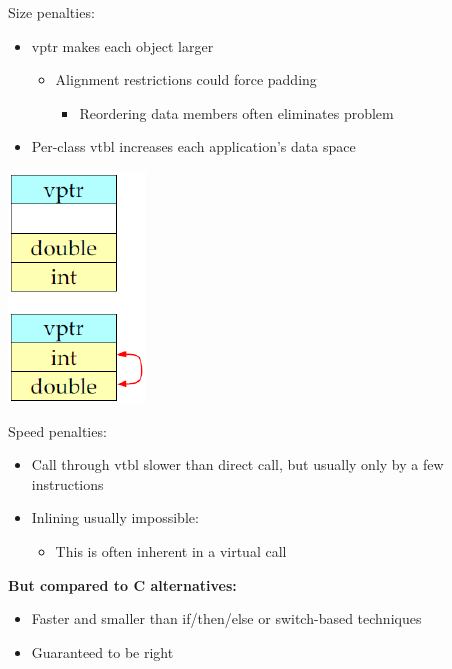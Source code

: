\begin{minipage}{0.75\linewidth}
Size penalties:
\begin{itemize}
  \item vptr makes each object larger
  \begin{itemize}
    \item Alignment restrictions could force padding
    \begin{itemize}
      \item Reordering data members often eliminates problem
    \end{itemize}
  \end{itemize}
  \item Per-class vtbl increases each application's data space
\end{itemize}
\end{minipage}%
\hfill
\begin{minipage}{0.2\linewidth}
\begin{center}
  \includegraphics[width=0.5\linewidth]{images/AdvancedCPP/sizePenalties}
\end{center}
\end{minipage}%

\pagebreak %

Speed penalties:
\begin{itemize}
  \item Call through vtbl slower than direct call, but usually only by a few instructions
  \item Inlining usually impossible:
  \begin{itemize}
    \item This is often inherent in a virtual call
  \end{itemize}
\end{itemize}
\textbf{But compared to C alternatives:}
\begin{itemize}
  \item Faster and smaller than if/then/else or switch-based techniques
  \item Guaranteed to be right
\end{itemize}

